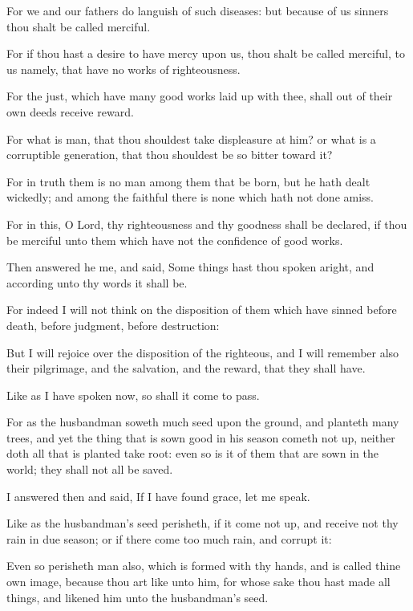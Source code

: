{\par }{\PP {}For we and our fathers do languish of such diseases: but because of us sinners thou shalt be called merciful.
\par }{\PP {}For if thou hast a desire to have mercy upon us, thou shalt be called merciful, to us namely, that have no works of righteousness.
\par }{\PP {}For the just, which have many good works laid up with thee, shall out of their own deeds receive reward.
\par }{\PP {}For what is man, that thou shouldest take displeasure at him? or what is a corruptible generation, that thou shouldest be so bitter toward it?
\par }{\PP {}For in truth them is no man among them that be born, but he hath dealt wickedly; and among the faithful there is none which hath not done amiss.
\par }{\PP {}For in this, O Lord, thy righteousness and thy goodness shall be declared, if thou be merciful unto them which have not the confidence of good works.
\par }{\PP {}Then answered he me, and said, Some things hast thou spoken aright, and according unto thy words it shall be.
\par }{\PP {}For indeed I will not think on the disposition of them which have sinned before death, before judgment, before destruction:
\par }{\PP {}But I will rejoice over the disposition of the righteous, and I will remember also their pilgrimage, and the salvation, and the reward, that they shall have.
\par }{\PP {}Like as I have spoken now, so shall it come to pass.
\par }{\PP {}For as the husbandman soweth much seed upon the ground, and planteth many trees, and yet the thing that is sown good in his season cometh not up, neither doth all that is planted take root: even so is it of them that are sown in the world; they shall not all be saved.
\par }{\PP {}I answered then and said, If I have found grace, let me speak.
\par }{\PP {}Like as the husbandman’s seed perisheth, if it come not up, and receive not thy rain in due season; or if there come too much rain, and corrupt it:
\par }{\PP {}Even so perisheth man also, which is formed with thy hands, and is called thine own image, because thou art like unto him, for whose sake thou hast made all things, and likened him unto the husbandman’s seed.
}
